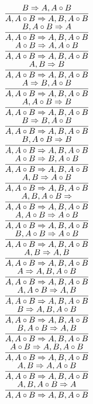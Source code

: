 \documentclass[11pt]{article}
\begin{document}
\begin{center}
\bigskip
\\$\infer{A, A\circ B\Rightarrow A, B, A\circ B}{B\Rightarrow A, A\circ B}$
\bigskip
\\$\infer{A, A\circ B\Rightarrow A, B, A\circ B}{B, A\circ B\Rightarrow A}$
\bigskip
\\$\infer{A, A\circ B\Rightarrow A, B, A\circ B}{A\circ B\Rightarrow A, A\circ B}$
\bigskip
\\$\infer{A, A\circ B\Rightarrow A, B, A\circ B}{A, B\Rightarrow B}$
\bigskip
\\$\infer{A, A\circ B\Rightarrow A, B, A\circ B}{A\Rightarrow B, A\circ B}$
\bigskip
\\$\infer{A, A\circ B\Rightarrow A, B, A\circ B}{A, A\circ B\Rightarrow B}$
\bigskip
\\$\infer{A, A\circ B\Rightarrow A, B, A\circ B}{B\Rightarrow B, A\circ B}$
\bigskip
\\$\infer{A, A\circ B\Rightarrow A, B, A\circ B}{B, A\circ B\Rightarrow B}$
\bigskip
\\$\infer{A, A\circ B\Rightarrow A, B, A\circ B}{A\circ B\Rightarrow B, A\circ B}$
\bigskip
\\$\infer{A, A\circ B\Rightarrow A, B, A\circ B}{A, B\Rightarrow A\circ B}$
\bigskip
\\$\infer{A, A\circ B\Rightarrow A, B, A\circ B}{A, B, A\circ B\Rightarrow }$
\bigskip
\\$\infer{A, A\circ B\Rightarrow A, B, A\circ B}{A, A\circ B\Rightarrow A\circ B}$
\bigskip
\\$\infer{A, A\circ B\Rightarrow A, B, A\circ B}{B, A\circ B\Rightarrow A\circ B}$
\bigskip
\\$\infer{A, A\circ B\Rightarrow A, B, A\circ B}{A, B\Rightarrow A, B}$
\bigskip
\\$\infer{A, A\circ B\Rightarrow A, B, A\circ B}{A\Rightarrow A, B, A\circ B}$
\bigskip
\\$\infer{A, A\circ B\Rightarrow A, B, A\circ B}{A, A\circ B\Rightarrow A, B}$
\bigskip
\\$\infer{A, A\circ B\Rightarrow A, B, A\circ B}{B\Rightarrow A, B, A\circ B}$
\bigskip
\\$\infer{A, A\circ B\Rightarrow A, B, A\circ B}{B, A\circ B\Rightarrow A, B}$
\bigskip
\\$\infer{A, A\circ B\Rightarrow A, B, A\circ B}{A\circ B\Rightarrow A, B, A\circ B}$
\bigskip
\\$\infer{A, A\circ B\Rightarrow A, B, A\circ B}{A, B\Rightarrow A, A\circ B}$
\bigskip
\\$\infer{A, A\circ B\Rightarrow A, B, A\circ B}{A, B, A\circ B\Rightarrow A}$

\end{center}
\end{document}
